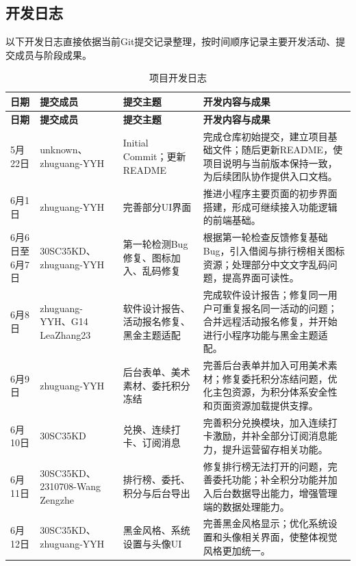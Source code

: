 \documentclass[a4paper,12pt]{article}
\begin{document}
\subsection{开发日志}

以下开发日志直接依据当前Git提交记录整理，按时间顺序记录主要开发活动、提交成员与阶段成果。

\begingroup
\renewcommand{\arraystretch}{1.22}
\setlength{\tabcolsep}{5pt}
\begin{longtable}{|>{\raggedright\arraybackslash}p{1.9cm}|>{\raggedright\arraybackslash}p{2.6cm}|>{\raggedright\arraybackslash}p{3.0cm}|>{\raggedright\arraybackslash}p{5.3cm}|}
\caption{项目开发日志}\\
\hline
\rowcolor{gray!18}
\textbf{日期} & \textbf{提交成员} & \textbf{提交主题} & \textbf{开发内容与成果} \\
\hline
\endfirsthead
\hline
\rowcolor{gray!18}
\textbf{日期} & \textbf{提交成员} & \textbf{提交主题} & \textbf{开发内容与成果} \\
\hline
\endhead
5月22日 & unknown、zhuguang-YYH & Initial Commit；更新README & 完成仓库初始提交，建立项目基础文件；随后更新README，使项目说明与当前版本保持一致，为后续团队协作提供入口文档。\\ \hline
6月1日 & zhuguang-YYH & 完善部分UI界面 & 推进小程序主要页面的初步界面搭建，形成可继续接入功能逻辑的前端基础。\\ \hline
6月6日至6月7日 & 30SC35KD、zhuguang-YYH & 第一轮检测Bug修复、图标加入、乱码修复 & 根据第一轮检查反馈修复基础Bug，引入借阅与排行榜相关图标资源；处理部分中文文字乱码问题，提高界面可读性。\\ \hline
6月8日 & zhuguang-YYH、G14 LeaZhang23 & 软件设计报告、活动报名修复、黑金主题适配 & 完成软件设计报告；修复同一用户可重复报名同一活动的问题；合并远程活动报名修复，并开始进行小程序功能与黑金主题适配。\\ \hline
6月9日 & zhuguang-YYH & 后台表单、美术素材、委托积分冻结 & 完善后台表单并加入可用美术素材；修复委托积分冻结问题，优化主包资源，为积分体系安全性和页面资源加载提供支撑。\\ \hline
6月10日 & 30SC35KD & 兑换、连续打卡、订阅消息 & 完善积分兑换模块，加入连续打卡激励，并补全部分订阅消息能力，提升运营留存相关功能。\\ \hline
6月11日 & 30SC35KD、2310708-Wang Zengzhe & 排行榜、委托、积分与后台导出 & 修复排行榜无法打开的问题，完善委托功能；补全积分功能并加入后台数据导出能力，增强管理端的数据处理能力。\\ \hline
6月12日 & 30SC35KD、zhuguang-YYH & 黑金风格、系统设置与头像UI & 完善黑金风格显示；优化系统设置和头像相关界面，使整体视觉风格更加统一。\\ \hline

\end{longtable}
\end{document}
